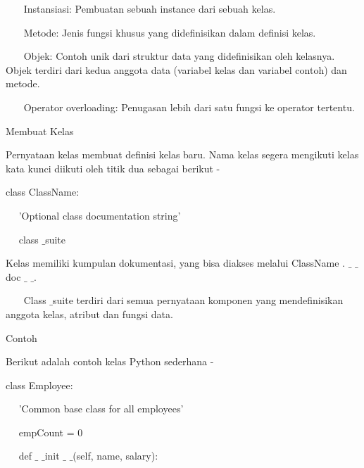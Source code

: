 \vspace{12pt}
~~~ Instansiasi: Pembuatan sebuah instance dari sebuah kelas. \par
\vspace{12pt}
~~~ Metode: Jenis fungsi khusus yang didefinisikan dalam definisi kelas. \par
\vspace{12pt}
~~~ Objek: Contoh unik dari struktur data yang didefinisikan oleh kelasnya. Objek terdiri dari kedua anggota data (variabel kelas dan variabel contoh) dan metode. \par
\vspace{12pt}
~~~ Operator overloading: Penugasan lebih dari satu fungsi ke operator tertentu. \par
\vspace{12pt}
Membuat Kelas \par
\vspace{12pt}
Pernyataan kelas membuat definisi kelas baru. Nama kelas segera mengikuti kelas kata kunci diikuti oleh titik dua sebagai berikut - \par
\vspace{12pt}
\vspace{12pt}
class ClassName: \par
~~ 'Optional class documentation string' \par
~~ class $  \_  $suite \par
\vspace{12pt}
\vspace{12pt}
Kelas memiliki kumpulan dokumentasi, yang bisa diakses melalui ClassName . $  \_  $ $  \_  $ doc $  \_  $ $  \_  $. \par
\vspace{12pt}
~~~ Class $  \_  $suite terdiri dari semua pernyataan komponen yang mendefinisikan anggota kelas, atribut dan fungsi data. \par
\vspace{12pt}
\vspace{12pt}
Contoh \par
\vspace{12pt}
Berikut adalah contoh kelas Python sederhana - \par
\vspace{12pt}
class Employee: \par
~~ 'Common base class for all employees' \par
~~ empCount = 0 \par
\vspace{12pt}
~~ def  $  \_  $ $  \_  $init $  \_  $ $  \_  $(self, name, salary): \par
